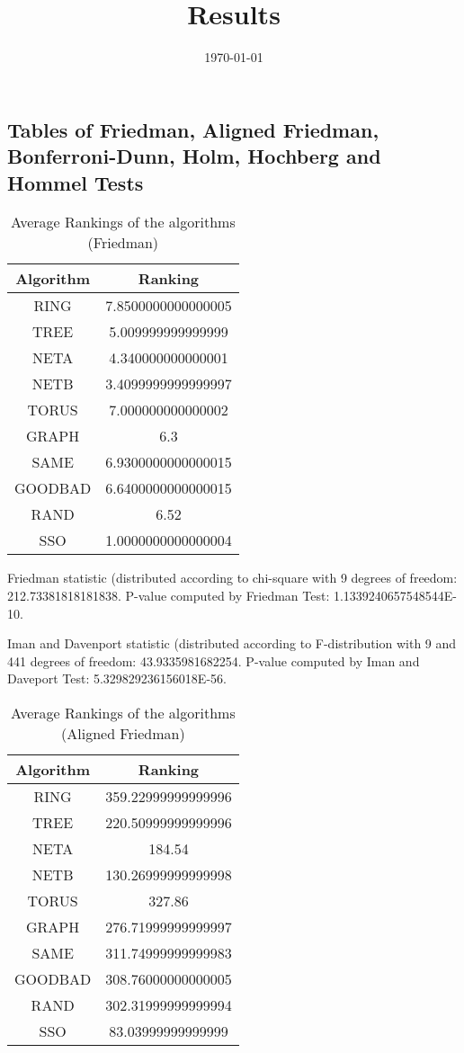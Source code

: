 \documentclass[a4paper,10pt]{article}
\title{Results}
\author{}
\date{\today}
\begin{document}
\begin{landscape}
\oddsidemargin 0in \topmargin 0in\maketitle
\section{Tables of Friedman, Aligned Friedman, Bonferroni-Dunn, Holm, Hochberg and Hommel Tests}
\begin{table}[!htp]
\centering
\caption{Average Rankings of the algorithms (Friedman)
}\begin{tabular}{c|c}
Algorithm&Ranking\\
\hline
 RING&7.8500000000000005\\
 TREE&5.009999999999999\\
 NETA&4.340000000000001\\
 NETB&3.4099999999999997\\
 TORUS&7.000000000000002\\
 GRAPH&6.3\\
 SAME&6.9300000000000015\\
 GOODBAD&6.6400000000000015\\
 RAND&6.52\\
 SSO&1.0000000000000004\\
\end{tabular}
\end{table}


Friedman statistic (distributed according to chi-square with 9 degrees of freedom: 212.73381818181838. 
P-value computed by Friedman Test: 1.1339240657548544E-10.\newline

Iman and Davenport statistic (distributed according to F-distribution with 9 and 441 degrees of freedom: 43.9335981682254. 
P-value computed by Iman and Daveport Test: 5.329829236156018E-56.\newline


\newpage

\begin{table}[!htp]
\centering
\caption{Average Rankings of the algorithms (Aligned Friedman)
}\begin{tabular}{c|c}
Algorithm&Ranking\\
\hline
 RING&359.22999999999996\\
 TREE&220.50999999999996\\
 NETA&184.54\\
 NETB&130.26999999999998\\
 TORUS&327.86\\
 GRAPH&276.71999999999997\\
 SAME&311.74999999999983\\
 GOODBAD&308.76000000000005\\
 RAND&302.31999999999994\\
 SSO&83.03999999999999\\
\end{tabular}
\end{table}



\end{landscape}
\end{document}
